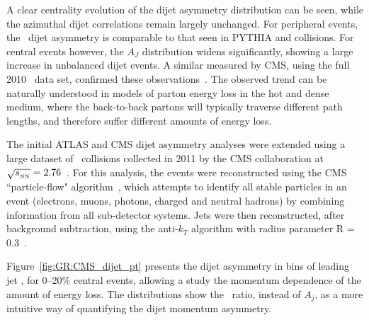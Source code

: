 A clear centrality evolution of the dijet asymmetry distribution can be seen, while the azimuthal
dijet correlations remain largely unchanged. For peripheral events, the \PbPb\ dijet asymmetry
is comparable to that seen in PYTHIA and \pp collisions. For central events however,
the $A_J$ distribution widens significantly, showing a large increase in unbalanced
dijet events. 
A similar measured by CMS, using the full 2010 \PbPb\ data set, confirmed these 
observations~\cite{Chatrchyan:2011sx}.
The observed trend can be naturally understood in models of parton energy
loss in the hot and dense medium, where the back-to-back partons will typically traverse
different path lengths, and therefore suffer different amounts of energy loss. 

The initial ATLAS and CMS dijet asymmetry analyses were extended using a 
large dataset of \PbPb\ collisions
collected in 2011 by the CMS collaboration at $\sqrt{s_{_{\rm NN}}}=2.76$\TeV~\cite{CMS_dijet}. For this analysis, the events were 
reconstructed using the  CMS ``particle-flow" algorithm~\cite{CMS-PAS-PFT-10-002,MattPFlow}, 
which attempts to identify all stable particles in an
event (electrons, muons, photons, charged and neutral hadrons)
by combining information from all sub-detector systems.
Jets were then reconstructed, after background subtraction, using the anti-$k_T$ algorithm 
with radius parameter R = 0.3~\cite{Cacciari:2008gp}.

Figure~\ref{fig:GR:CMS_dijet_pt} presents the dijet asymmetry in bins of leading jet
\pT, for 0--20\% central events, allowing a study the momentum dependence of the amount of energy loss.
The distributions show the \ptrat\ ratio, instead of $A_j$,  as a more intuitive
way of quantifying the dijet momentum asymmetry.

